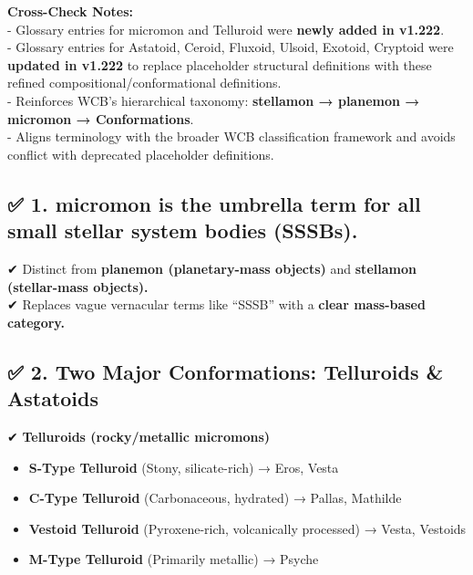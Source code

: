\documentclass[
  letterpaper,
]{book}
\providecommand{\tightlist}{%
  \setlength{\itemsep}{0pt}\setlength{\parskip}{0pt}}
\begin{document}
\textbf{Cross-Check Notes:}\\
- Glossary entries for micromon and Telluroid were \textbf{newly added
in v1.222}.\\
- Glossary entries for Astatoid, Ceroid, Fluxoid, Ulsoid, Exotoid,
Cryptoid were \textbf{updated in v1.222} to replace placeholder
structural definitions with these refined compositional/conformational
definitions.\\
- Reinforces WCB's hierarchical taxonomy: \textbf{stellamon → planemon →
micromon → Conformations}.\\
- Aligns terminology with the broader WCB classification framework and
avoids conflict with deprecated placeholder definitions.

\subsection{\texorpdfstring{\textbf{✅ 1. micromon is the umbrella term
for all small stellar system bodies
(SSSBs).}}{✅ 1. micromon is the umbrella term for all small stellar system bodies (SSSBs).}}\label{micromon-is-the-umbrella-term-for-all-small-stellar-system-bodies-sssbs.}

✔ Distinct from \textbf{planemon (planetary-mass objects)} and
\textbf{stellamon (stellar-mass objects).}\\
✔ Replaces vague vernacular terms like ``SSSB'' with a \textbf{clear
mass-based category.}

\subsection{\texorpdfstring{\textbf{✅ 2. Two Major Conformations:
Telluroids \&
Astatoids}}{✅ 2. Two Major Conformations: Telluroids \& Astatoids}}\label{two-major-conformations-telluroids-astatoids}

✔ \textbf{Telluroids (rocky/metallic micromons)}

\begin{itemize}
\tightlist
\item
  \textbf{S-Type Telluroid} (Stony, silicate-rich) → Eros, Vesta
\item
  \textbf{C-Type Telluroid} (Carbonaceous, hydrated) → Pallas, Mathilde
\item
  \textbf{Vestoid Telluroid} (Pyroxene-rich, volcanically processed) →
  Vesta, Vestoids
\item
  \textbf{M-Type Telluroid} (Primarily metallic) → Psyche
\end{itemize}
\end{document}
